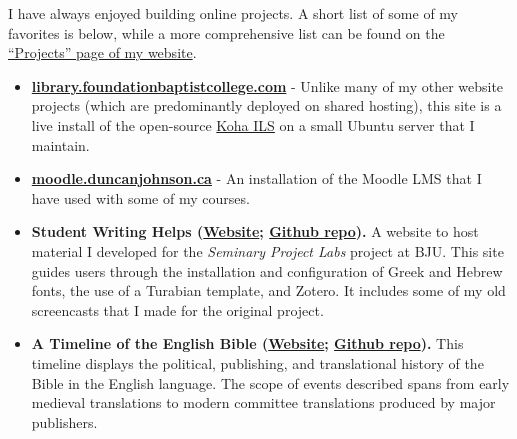 
I have always enjoyed building online projects. A short list of some of my favorites is below, while a more comprehensive list can be found on the \href{http://duncanjohnson.ca/projects/}{``Projects'' page of my website}.

\begin{itemize}
\item \textbf{\href{http://library.foundationbaptistcollege.com/}{library.foundationbaptistcollege.com}} - Unlike many of my other website projects (which are predominantly deployed on shared hosting), this site is a live install of the open-source \href{https://koha-community.org/}{Koha ILS} on a small Ubuntu server that I maintain.
\item \textbf{\href{http://moodle.duncanjohnson.ca/}{moodle.duncanjohnson.ca}} - An installation of the Moodle LMS that I have used with some of my courses.
\item \textbf{Student Writing Helps (\href{http://duncanjohnson.ca/Student-Writing-Helps/}{Website}; \href{https://github.com/dtjohnso/Student-Writing-Helps}{Github repo}).} A website to host material I developed for the \textit{Seminary Project Labs} project at BJU. This site guides users through the installation and configuration of Greek and Hebrew fonts, the use of a Turabian template, and Zotero. It includes some of my old screencasts that I made for the original project.
\item \textbf{A Timeline of the English Bible (\href{http://duncanjohnson.ca/English-Bible/}{Website}; \href{https://github.com/dtjohnso/English-Bible}{Github repo}).} This timeline displays the political, publishing, and translational history of the Bible in the English language. The scope of events described spans from early medieval translations to modern committee translations produced by major publishers.
\end{itemize}